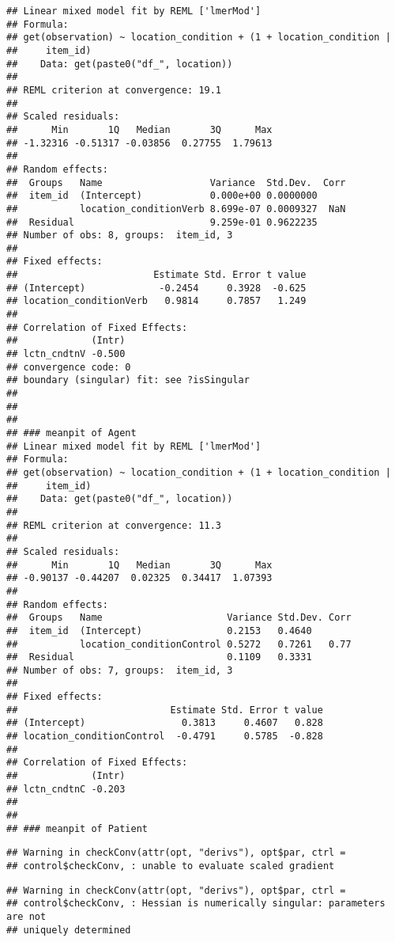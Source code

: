\documentclass[]{article}
\begin{document}
\begin{verbatim}
## Linear mixed model fit by REML ['lmerMod']
## Formula: 
## get(observation) ~ location_condition + (1 + location_condition |  
##     item_id)
##    Data: get(paste0("df_", location))
## 
## REML criterion at convergence: 19.1
## 
## Scaled residuals: 
##      Min       1Q   Median       3Q      Max 
## -1.32316 -0.51317 -0.03856  0.27755  1.79613 
## 
## Random effects:
##  Groups   Name                   Variance  Std.Dev.  Corr
##  item_id  (Intercept)            0.000e+00 0.0000000     
##           location_conditionVerb 8.699e-07 0.0009327  NaN
##  Residual                        9.259e-01 0.9622235     
## Number of obs: 8, groups:  item_id, 3
## 
## Fixed effects:
##                        Estimate Std. Error t value
## (Intercept)             -0.2454     0.3928  -0.625
## location_conditionVerb   0.9814     0.7857   1.249
## 
## Correlation of Fixed Effects:
##             (Intr)
## lctn_cndtnV -0.500
## convergence code: 0
## boundary (singular) fit: see ?isSingular
## 
##   
##   
## ### meanpit of Agent   
## Linear mixed model fit by REML ['lmerMod']
## Formula: 
## get(observation) ~ location_condition + (1 + location_condition |  
##     item_id)
##    Data: get(paste0("df_", location))
## 
## REML criterion at convergence: 11.3
## 
## Scaled residuals: 
##      Min       1Q   Median       3Q      Max 
## -0.90137 -0.44207  0.02325  0.34417  1.07393 
## 
## Random effects:
##  Groups   Name                      Variance Std.Dev. Corr
##  item_id  (Intercept)               0.2153   0.4640       
##           location_conditionControl 0.5272   0.7261   0.77
##  Residual                           0.1109   0.3331       
## Number of obs: 7, groups:  item_id, 3
## 
## Fixed effects:
##                           Estimate Std. Error t value
## (Intercept)                 0.3813     0.4607   0.828
## location_conditionControl  -0.4791     0.5785  -0.828
## 
## Correlation of Fixed Effects:
##             (Intr)
## lctn_cndtnC -0.203
##   
##   
## ### meanpit of Patient
\end{verbatim}

\begin{verbatim}
## Warning in checkConv(attr(opt, "derivs"), opt$par, ctrl =
## control$checkConv, : unable to evaluate scaled gradient
\end{verbatim}

\begin{verbatim}
## Warning in checkConv(attr(opt, "derivs"), opt$par, ctrl =
## control$checkConv, : Hessian is numerically singular: parameters are not
## uniquely determined
\end{verbatim}
\end{document}
